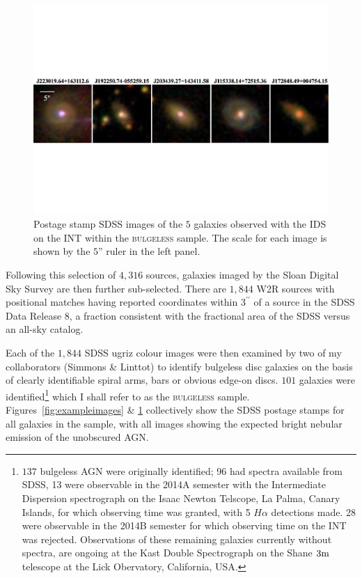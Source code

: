 \begin{figure}
\centering
\includegraphics[width=\textwidth]{agn/mosaic_INT_gal_only.pdf}
\caption[SDSS images of 5 galaxies observed with the IDS on the INT]{Postage stamp SDSS images of the $5$ galaxies observed with the IDS on the INT within the \textsc{bulgeless} sample. The scale for each image is shown by the $5$'' ruler in the left panel.}
\label{fig:INTimages}
\end{figure}


Following this selection of $4,316$ sources, galaxies imaged by the Sloan Digital Sky Survey are then further sub-selected. There are $1,844$ W2R sources with positional matches having reported coordinates within $3^{\prime \prime}$ of a source in the SDSS \citep{york00} Data Release 8, a fraction consistent with the fractional area of the SDSS versus an all-sky catalog. %

Each of the $1, 844$ SDSS ugriz colour images were then examined by two of my collaborators (Simmons \& Linttot) to identify bulgeless disc galaxies on the basis of clearly identifiable spiral arms, bars or obvious edge-on discs. $101$ galaxies were identified\footnote{$137$ bulgeless AGN were originally identified; 96 had spectra available from SDSS, 13 were observable in the 2014A semester with the Intermediate Dispersion spectrograph on the Isaac Newton Telscope, La Palma, Canary Islands, for which observing time was granted, with 5 $H\alpha$ detections made. 28 were observable in the 2014B semester for which observing time on the INT was rejected. Observations of these remaining galaxies currently without spectra, are ongoing at the Kast Double Spectrograph on the Shane $3\rm{m}$ telescope at the Lick Obervatory, California, USA.} which I shall refer to as the \textsc{bulgeless} sample. Figures~\ref{fig:exampleimages} \& \ref{fig:INTimages} collectively show the SDSS postage stamps for all galaxies in the sample, with all images showing the expected bright nebular emission of the unobscured AGN. 

